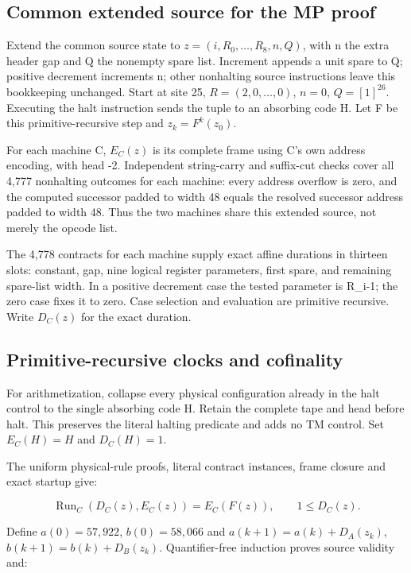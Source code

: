 \documentclass[10pt,a4paper]{article}
\begin{document}
\subsection{Common extended source for the MP proof}\label{common-extended-source-for-the-mp-proof}

Extend the common source state to \(z=(i,R_0,\ldots,R_8,n,Q)\), with n the extra header gap and Q the nonempty spare list. Increment appends a unit spare to Q; positive decrement increments n; other nonhalting source instructions leave this bookkeeping unchanged. Start at site 25, \(R=(2,0,\ldots,0)\), \(n=0\), \(Q=[1]^{26}\). Executing the halt instruction sends the tuple to an absorbing code H. Let F be this primitive-recursive step and \(z_k=F^k(z_0)\).

For each machine C, \(E_C(z)\) is its complete frame using C's own address encoding, with head -2. Independent string-carry and suffix-cut checks cover all 4,777 nonhalting outcomes for each machine: every address overflow is zero, and the computed successor padded to width 48 equals the resolved successor address padded to width 48. Thus the two machines share this extended source, not merely the opcode list.

The 4,778 contracts for each machine supply exact affine durations in thirteen slots: constant, gap, nine logical register parameters, first spare, and remaining spare-list width. In a positive decrement case the tested parameter is R\_i-1; the zero case fixes it to zero. Case selection and evaluation are primitive recursive. Write \(D_C(z)\) for the exact duration.

\subsection{Primitive-recursive clocks and cofinality}\label{primitive-recursive-clocks-and-cofinality}

For arithmetization, collapse every physical configuration already in the halt control to the single absorbing code H. Retain the complete tape and head before halt. This preserves the literal halting predicate and adds no TM control. Set \(E_C(H)=H\) and \(D_C(H)=1\).

The uniform physical-rule proofs, literal contract instances, frame closure and exact startup give:

\[
\operatorname{Run}_C(D_C(z),E_C(z))=E_C(F(z)),\qquad 1\leq D_C(z).
\]

Define \(a(0)=57{,}922\), \(b(0)=58{,}066\) and \(a(k+1)=a(k)+D_A(z_k)\), \(b(k+1)=b(k)+D_B(z_k)\). Quantifier-free induction proves source validity and:
\end{document}
